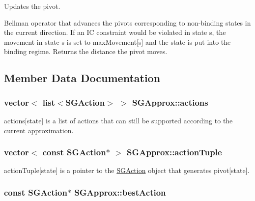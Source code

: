 Updates the pivot. 

Bellman operator that advances the pivots corresponding to non-\/binding states in the current direction. If an I\-C constraint would be violated in state s, the movement in state s is set to max\-Movement\mbox{[}s\mbox{]} and the state is put into the binding regime. Returns the distance the pivot moves. 

\subsection{Member Data Documentation}
\hypertarget{classSGApprox_a0fccecf0f5dbe7e9288e47182f180879}{
\subsubsection[{actions}]{\setlength{\rightskip}{0pt plus 5cm}vector$<$ list$<${\bf S\-G\-Action}$>$ $>$ S\-G\-Approx\-::actions\hspace{0.3cm}{\ttfamily [private]}}}\label{classSGApprox_a0fccecf0f5dbe7e9288e47182f180879}
actions\mbox{[}state\mbox{]} is a list of actions that can still be supported according to the current approximation. \hypertarget{classSGApprox_a507eb6895c5a99c5d1efba8107989187}{
\subsubsection[{action\-Tuple}]{\setlength{\rightskip}{0pt plus 5cm}vector$<$ const {\bf S\-G\-Action}$\ast$ $>$ S\-G\-Approx\-::action\-Tuple\hspace{0.3cm}{\ttfamily [private]}}}\label{classSGApprox_a507eb6895c5a99c5d1efba8107989187}
action\-Tuple\mbox{[}state\mbox{]} is a pointer to the \hyperlink{classSGAction}{S\-G\-Action} object that generates pivot\mbox{[}state\mbox{]}. \hypertarget{classSGApprox_a9769774aa8829e1e5adec2e4a2bb35ae}{
\subsubsection[{best\-Action}]{\setlength{\rightskip}{0pt plus 5cm}const {\bf S\-G\-Action}$\ast$ S\-G\-Approx\-::best\-Action\hspace{0.3cm}{\ttfamily [private]}}}\label{classSGApprox_a9769774aa8829e1e5adec2e4a2bb35ae}

